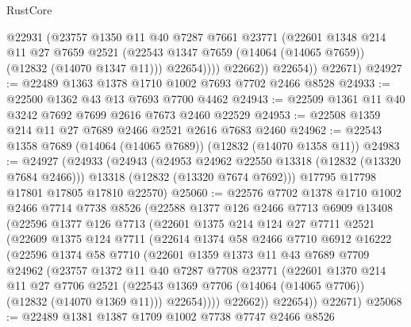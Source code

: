 \begin{lexlean}{RustCore}
\begin{coremodule}
                  @22931
                  (@23757
                    @1350
                    @11
                    @40
                    @7287
                    @7661
                    @23771
                    (@22601
                      @1348
                      @214
                      @11
                      @27
                      @7659
                      @2521
                      (@22543 @1347 @7659 (@14064 (@14065 @7659)) (@12832 (@14070 @1347 @11)))
                      @22654))))
              @22662))
          @22654))
      @22671)
@24927 := @22489 @1363 @1378 @1710 @1002 @7693 @7702 @2466 @8528
@24933 := @22500 @1362 @43 @13 @7693 @7700 @4462
@24943 := @22509 @1361 @11 @40 @3242 @7692 @7699 @2616 @7673 @2460 @22529
@24953 := @22508 @1359 @214 @11 @27 @7689 @2466 @2521 @2616 @7683 @2460
@24962 := @22543 @1358 @7689 (@14064 (@14065 @7689)) (@12832 (@14070 @1358 @11))
@24983 := @24927
    (@24933
      (@24943
        (@24953 @24962 @22550 @13318 (@12832 (@13320 @7684 @2466)))
        @13318
        (@12832 (@13320 @7674 @7692)))
      @17795
      @17798
      @17801
      @17805
      @17810
      @22570)
@25060 := @22576
    @7702
    @1378
    @1710
    @1002
    @2466
    @7714
    @7738
    @8526
    (@22588
      @1377
      @126
      @2466
      @7713
      @6909
      @13408
      (@22596
        @1377
        @126
        @7713
        (@22601
          @1375
          @214
          @124
          @27
          @7711
          @2521
          (@22609
            @1375
            @124
            @7711
            (@22614
              @1374
              @58
              @2466
              @7710
              @6912
              @16222
              (@22596
                @1374
                @58
                @7710
                (@22601
                  @1359
                  @1373
                  @11
                  @43
                  @7689
                  @7709
                  @24962
                  (@23757
                    @1372
                    @11
                    @40
                    @7287
                    @7708
                    @23771
                    (@22601
                      @1370
                      @214
                      @11
                      @27
                      @7706
                      @2521
                      (@22543 @1369 @7706 (@14064 (@14065 @7706)) (@12832 (@14070 @1369 @11)))
                      @22654))))
              @22662))
          @22654))
      @22671)
@25068 := @22489 @1381 @1387 @1709 @1002 @7738 @7747 @2466 @8526

\end{coremodule}
\end{lexlean}
